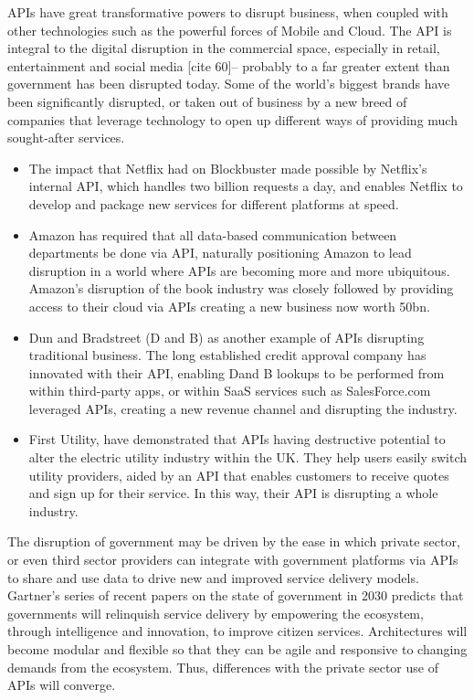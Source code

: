 APIs have great transformative powers to disrupt business, when coupled
with other technologies such as the powerful forces of Mobile and Cloud.
The API is integral to the digital disruption in the commercial space,
especially in retail, entertainment and social media [cite 60]– probably
to a far greater extent than government has been disrupted today. Some
of the world’s biggest brands have been significantly disrupted, or taken
out of business by a new breed of companies that leverage technology to
open up different ways of providing much sought-after services.
\begin{itemize}
	\item The impact that Netflix had on Blockbuster made possible by
	Netflix’s internal API, which handles two billion requests a day,
	and enables Netflix to develop and package new services for different
	platforms at speed.
	\item Amazon has required that all data-based communication between
	departments be done via API, naturally positioning Amazon to lead
	disruption in a world where APIs are becoming more and more ubiquitous.
	Amazon’s disruption of the book industry was closely followed by providing
	access to their cloud via APIs creating a new business now worth 50bn.
	\item Dun and Bradstreet (D and B) as another example of APIs disrupting
	traditional business. The long established credit approval company has
	innovated with their API, enabling Dand B lookups to be performed from
	within third-party apps, or within SaaS services such as SalesForce.com
	leveraged APIs, creating a new revenue channel and disrupting the industry.
	\item First Utility, have demonstrated that APIs having destructive
	potential to alter the electric utility	industry within the UK. They
	help users easily switch utility providers, aided by an API that enables
	customers to receive quotes and sign up for their service. In this way,
	their API is disrupting a whole industry.
\end{itemize}

The disruption of government may be driven by the ease in which private sector,
or even third sector providers can integrate with government platforms via APIs
to share and use data to drive new and improved service delivery models.
Gartner’s series of recent papers on the state of government in 2030 predicts
that governments will relinquish service delivery by empowering the ecosystem,
through intelligence and innovation, to improve citizen services. Architectures
will become modular and flexible so that they can be agile and responsive to
changing demands from the ecosystem. Thus, differences with the private sector
use of APIs will converge.

